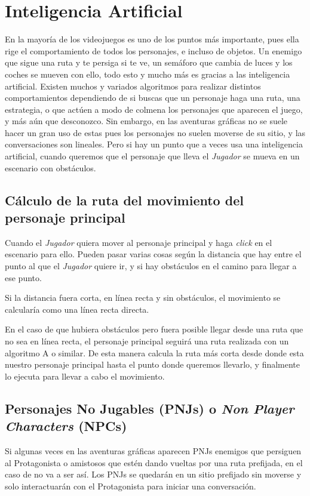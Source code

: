 	\section{Inteligencia Artificial}
	En la mayoría de los videojuegos es uno de los puntos más importante, pues ella rige el comportamiento de todos los personajes, e incluso de objetos. Un enemigo que sigue una ruta y te persiga si te ve, un semáforo que cambia de luces y los coches se mueven con ello, todo esto y mucho más es gracias a las inteligencia artificial. Existen muchos y variados algoritmos para realizar distintos comportamientos dependiendo de si buscas que un personaje haga una ruta, una estrategia, o que actúen a modo de colmena los personajes que aparecen el juego, y más aún que desconozco. Sin embargo, en las aventuras gráficas no se suele hacer un gran uso de estas pues los personajes no suelen moverse de su sitio, y las conversaciones son lineales. Pero si hay un punto que a veces usa una inteligencia artificial, cuando queremos que el personaje que lleva el \emph{Jugador} se mueva en un escenario con obstáculos.
        
            \subsection{Cálculo de la ruta del movimiento del personaje principal}
             Cuando el \emph{Jugador} quiera mover al personaje principal y haga \emph{click} en el escenario para ello. Pueden pasar varias cosas según la distancia que hay entre el punto al que el \emph{Jugador} quiere ir, y si hay obstáculos en el camino para llegar a ese punto.
             
             Si la distancia fuera corta, en línea recta y sin obstáculos, el movimiento se calcularía como una línea recta directa.
             
             En el caso de que hubiera obstáculos pero fuera posible llegar desde una ruta que no sea en línea recta, el personaje principal seguirá una ruta realizada con un algoritmo A\* o similar. De esta manera calcula la ruta más corta desde donde esta nuestro personaje principal hasta el punto donde queremos llevarlo, y finalmente lo ejecuta para llevar a cabo el movimiento.
            
            \subsection{Personajes No Jugables (PNJs) o \emph{Non Player Characters} (NPCs)}
        	Si algunas veces en las aventuras gráficas aparecen PNJs enemigos que persiguen al Protagonista o amistosos que estén dando vueltas por una ruta prefijada, en el caso de \nombrejuego no va a ser así. Los PNJs se quedarán en un sitio prefijado sin moverse y solo interactuarán con el Protagonista para iniciar una conversación. 
            
